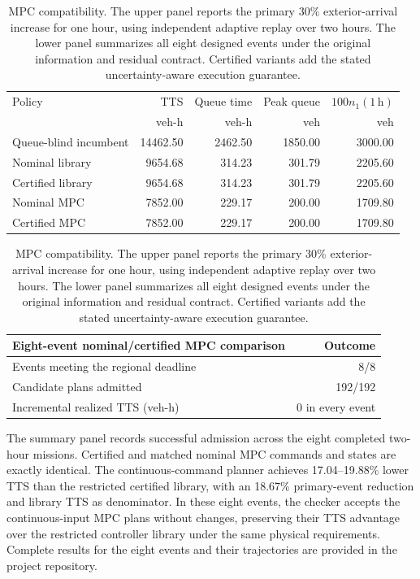 \documentclass[preprint,12pt]{elsarticle}
\begin{document}
\begin{table}[t]
\centering
\caption{MPC compatibility. The upper panel reports the primary 30\%
exterior-arrival increase for one hour, using independent adaptive replay
over two hours. The lower panel summarizes all eight designed events under
the original information and residual contract. Certified variants add the
stated uncertainty-aware execution guarantee.}
\label{tab:new-incident-primary}
\small
\setlength{\tabcolsep}{4pt}
\begin{tabular}{@{}lrrrr@{}}
\toprule
Policy & TTS & Queue time & Peak queue & $100n_1(1\,\mathrm h)$\\
& veh-h & veh-h & veh & veh\\
\midrule
Queue-blind incumbent & 14462.50 & 2462.50 & 1850.00 & 3000.00\\
Nominal library & 9654.68 & 314.23 & 301.79 & 2205.60\\
Certified library & 9654.68 & 314.23 & 301.79 & 2205.60\\
Nominal MPC & 7852.00 & 229.17 & 200.00 & 1709.80\\
Certified MPC & 7852.00 & 229.17 & 200.00 & 1709.80\\
\bottomrule
\end{tabular}
\par\medskip
\begin{tabular}{@{}lr@{}}
\toprule
Eight-event nominal/certified MPC comparison & Outcome\\
\midrule
Events meeting the regional deadline & 8/8\\
Candidate plans admitted & 192/192\\
Incremental realized TTS (veh-h) & 0 in every event\\
\bottomrule
\end{tabular}
\end{table}

The summary panel records successful admission across the eight completed
two-hour missions. Certified and matched nominal MPC commands and states
are exactly identical. The continuous-command planner
achieves 17.04--19.88\% lower TTS than the restricted certified library,
with an 18.67\% primary-event reduction and library TTS as denominator.
In these eight events, the checker accepts the continuous-input MPC plans
without changes, preserving their TTS advantage over the restricted
controller library under the same physical requirements.
Complete results for the eight events and their trajectories are provided
in the project repository.
\end{document}

